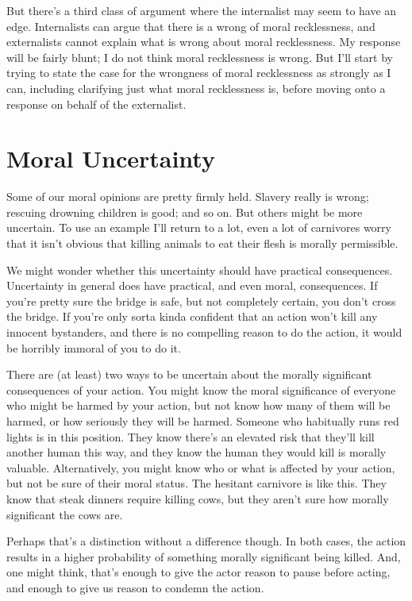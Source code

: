 \documentclass[
  11pt,
  letterpaper,
  DIV=11,
  numbers=noendperiod,
  twoside]{scrartcl}
\begin{document}
But there's a third class of argument where the internalist may seem to
have an edge. Internalists can argue that there is a wrong of moral
recklessness, and externalists cannot explain what is wrong about moral
recklessness. My response will be fairly blunt; I do not think moral
recklessness is wrong. But I'll start by trying to state the case for
the wrongness of moral recklessness as strongly as I can, including
clarifying just what moral recklessness is, before moving onto a
response on behalf of the externalist.

\section{Moral Uncertainty}\label{moraluncertainty}

Some of our moral opinions are pretty firmly held. Slavery really is
wrong; rescuing drowning children is good; and so on. But others might
be more uncertain. To use an example I'll return to a lot, even a lot of
carnivores worry that it isn't obvious that killing animals to eat their
flesh is morally permissible.

We might wonder whether this uncertainty should have practical
consequences. Uncertainty in general does have practical, and even
moral, consequences. If you're pretty sure the bridge is safe, but not
completely certain, you don't cross the bridge. If you're only sorta
kinda confident that an action won't kill any innocent bystanders, and
there is no compelling reason to do the action, it would be horribly
immoral of you to do it.

There are (at least) two ways to be uncertain about the morally
significant consequences of your action. You might know the moral
significance of everyone who might be harmed by your action, but not
know how many of them will be harmed, or how seriously they will be
harmed. Someone who habitually runs red lights is in this position. They
know there's an elevated risk that they'll kill another human this way,
and they know the human they would kill is morally valuable.
Alternatively, you might know who or what is affected by your action,
but not be sure of their moral status. The hesitant carnivore is like
this. They know that steak dinners require killing cows, but they aren't
sure how morally significant the cows are.

Perhaps that's a distinction without a difference though. In both cases,
the action results in a higher probability of something morally
significant being killed. And, one might think, that's enough to give
the actor reason to pause before acting, and enough to give us reason to
condemn the action.
\end{document}
